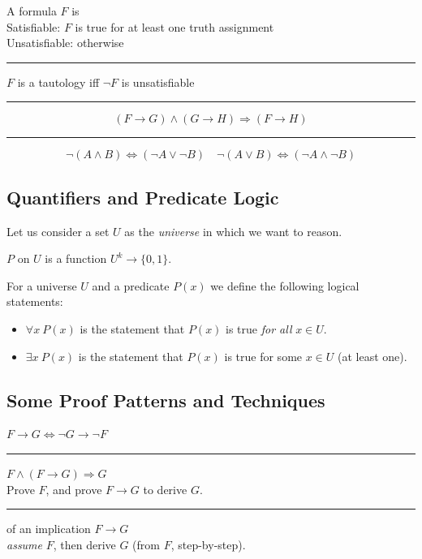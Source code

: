 \documentclass[a4paper]{extarticle}
\newcommand{\sep}{\vspace{5pt}\noindent\hrule\vspace{5pt}}
\begin{document}
\begin{multicols*}{2}
\Def[Satisfyability] A formula $F$ is
\\
Satisfiable: $F$ is true for at least one truth assignment
\\
Unsatisfiable: otherwise

\sep

\Lem $F$ is a tautology iff $\lnot F$ is unsatisfiable

\sep

\[
(F\to G)\land (G\to H) \Longrightarrow (F\to H) 
\]

\sep

\Thm[De Morgan]
\[
\lnot (A\land B) \Longleftrightarrow (\lnot A \lor \lnot B)
\quad 
\lnot (A\lor B) \Longleftrightarrow (\lnot A \land \lnot B)
\]

\subsection{Quantifiers and Predicate Logic}

Let us consider a set $U$ as the \emph{universe} in which we want to reason.

 $P$ on $U$ is a function $U^k\to\{0,1\}$.

\Def For a universe $U$ and a predicate $P(x)$ we define the following
logical statements:
\begin{itemize}
  \item $\forall x \ P(x)$ is the statement that $P(x)$ is true \emph{for all}
  $x\in U$.
  \item $\exists x \ P(x)$ is the statement that $P(x)$ is true for some
  $x\in U$ (at least one).
\end{itemize}


\subsection{Some Proof Patterns and Techniques}

\Thm[Contraposition]
$
F\rightarrow G \Longleftrightarrow \lnot G \rightarrow \lnot F
$

\sep

 $F\land (F\rightarrow G)\Longrightarrow G$
\\
Prove $F$, and prove $F\rightarrow G$ to derive $G$.

\sep

 of an implication $F\to G$
\\
\emph{assume} $F$, then derive $G$ (from $F$, step-by-step).


\end{multicols*}
\end{document}
